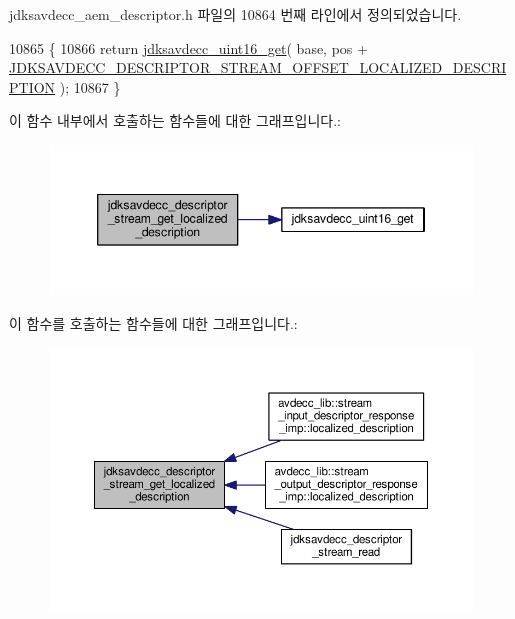 jdksavdecc\+\_\+aem\+\_\+descriptor.\+h 파일의 10864 번째 라인에서 정의되었습니다.


\begin{DoxyCode}
10865 \{
10866     \textcolor{keywordflow}{return} \hyperlink{group__endian_ga3fbbbc20be954aa61e039872965b0dc9}{jdksavdecc\_uint16\_get}( base, pos + 
      \hyperlink{group__descriptor__stream_ga2657a8ac3f36d017002e5fe3073942ab}{JDKSAVDECC\_DESCRIPTOR\_STREAM\_OFFSET\_LOCALIZED\_DESCRIPTION}
       );
10867 \}
\end{DoxyCode}


이 함수 내부에서 호출하는 함수들에 대한 그래프입니다.\+:
\nopagebreak
\begin{figure}[H]
\begin{center}
\leavevmode
\includegraphics[width=346pt]{group__descriptor__stream_ga5a240a9d26b6dbb014df8eb5ffa3b6b0_cgraph}
\end{center}
\end{figure}




이 함수를 호출하는 함수들에 대한 그래프입니다.\+:
\nopagebreak
\begin{figure}[H]
\begin{center}
\leavevmode
\includegraphics[width=350pt]{group__descriptor__stream_ga5a240a9d26b6dbb014df8eb5ffa3b6b0_icgraph}
\end{center}
\end{figure}


